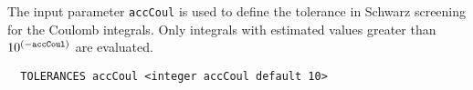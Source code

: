 
%

The input
parameter {\tt accCoul} is used to define the tolerance in Schwarz 
screening for the Coulomb integrals.  Only integrals with estimated
values greater than $10^{(-{\tt accCoul})}$ are evaluated.

\begin{verbatim}
  TOLERANCES accCoul <integer accCoul default 10>
\end{verbatim}


